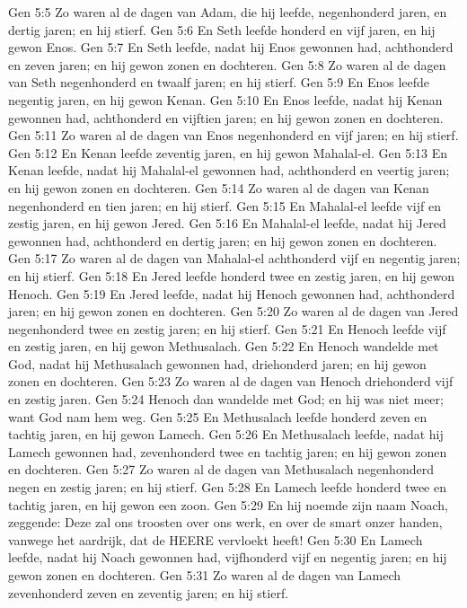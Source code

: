 Gen 5:5  Zo waren al de dagen van Adam, die hij leefde, negenhonderd jaren, en dertig jaren; en hij stierf.
Gen 5:6  En Seth leefde honderd en vijf jaren, en hij gewon Enos.
Gen 5:7  En Seth leefde, nadat hij Enos gewonnen had, achthonderd en zeven jaren; en hij gewon zonen en dochteren.
Gen 5:8  Zo waren al de dagen van Seth negenhonderd en twaalf jaren; en hij stierf.
Gen 5:9  En Enos leefde negentig jaren, en hij gewon Kenan.
Gen 5:10  En Enos leefde, nadat hij Kenan gewonnen had, achthonderd en vijftien jaren; en hij gewon zonen en dochteren.
Gen 5:11  Zo waren al de dagen van Enos negenhonderd en vijf jaren; en hij stierf.
Gen 5:12  En Kenan leefde zeventig jaren, en hij gewon Mahalal-el.
Gen 5:13  En Kenan leefde, nadat hij Mahalal-el gewonnen had, achthonderd en veertig jaren; en hij gewon zonen en dochteren.
Gen 5:14  Zo waren al de dagen van Kenan negenhonderd en tien jaren; en hij stierf.
Gen 5:15  En Mahalal-el leefde vijf en zestig jaren, en hij gewon Jered.
Gen 5:16  En Mahalal-el leefde, nadat hij Jered gewonnen had, achthonderd en dertig jaren; en hij gewon zonen en dochteren.
Gen 5:17  Zo waren al de dagen van Mahalal-el achthonderd vijf en negentig jaren; en hij stierf.
Gen 5:18  En Jered leefde honderd twee en zestig jaren, en hij gewon Henoch.
Gen 5:19  En Jered leefde, nadat hij Henoch gewonnen had, achthonderd jaren; en hij gewon zonen en dochteren.
Gen 5:20  Zo waren al de dagen van Jered negenhonderd twee en zestig jaren; en hij stierf.
Gen 5:21  En Henoch leefde vijf en zestig jaren, en hij gewon Methusalach.
Gen 5:22  En Henoch wandelde met God, nadat hij Methusalach gewonnen had, driehonderd jaren; en hij gewon zonen en dochteren.
Gen 5:23  Zo waren al de dagen van Henoch driehonderd vijf en zestig jaren.
Gen 5:24  Henoch dan wandelde met God; en hij was niet meer; want God nam hem weg.
Gen 5:25  En Methusalach leefde honderd zeven en tachtig jaren, en hij gewon Lamech.
Gen 5:26  En Methusalach leefde, nadat hij Lamech gewonnen had, zevenhonderd twee en tachtig jaren; en hij gewon zonen en dochteren.
Gen 5:27  Zo waren al de dagen van Methusalach negenhonderd negen en zestig jaren; en hij stierf.
Gen 5:28  En Lamech leefde honderd twee en tachtig jaren, en hij gewon een zoon.
Gen 5:29  En hij noemde zijn naam Noach, zeggende: Deze zal ons troosten over ons werk, en over de smart onzer handen, vanwege het aardrijk, dat de HEERE vervloekt heeft!
Gen 5:30  En Lamech leefde, nadat hij Noach gewonnen had, vijfhonderd vijf en negentig jaren; en hij gewon zonen en dochteren.
Gen 5:31  Zo waren al de dagen van Lamech zevenhonderd zeven en zeventig jaren; en hij stierf.
